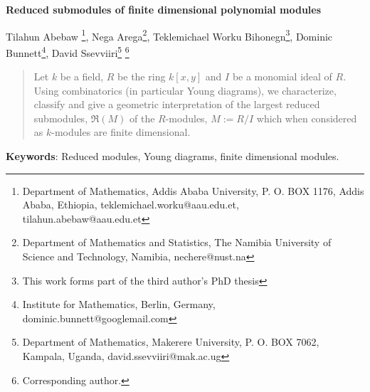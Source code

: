 \documentclass[12pt,a4paper]{article}
\begin{document}
	
	
	
	
		
		\begin{center}\Large{\bf{Reduced submodules of finite dimensional polynomial modules}}
			
		\end{center}
		\vspace*{0.3cm}
		\begin{center}
			
			
			
			
			Tilahun Abebaw \footnote{Department of Mathematics, Addis Ababa University, P. O. BOX 1176, Addis Ababa, Ethiopia, teklemichael.worku@aau.edu.et, tilahun.abebaw@aau.edu.et}, Nega Arega\footnote {Department of Mathematics and Statistics, The Namibia University of Science and Technology, Namibia,  nechere@nust.na},
			Teklemichael Worku Bihonegn\footnotemark[1] \footnote{This work forms part of the third author's PhD thesis}, Dominic Bunnett\footnote{Institute for Mathematics, Berlin, Germany, dominic.bunnett@googlemail.com},
			David Ssevviiri\footnote[5]{Department of Mathematics, Makerere University, P. O. BOX 7062, Kampala, Uganda, david.ssevviiri@mak.ac.ug} \footnote[6] {Corresponding author.}
		\end{center}
		
		\begin{abstract}
			Let $k$ be a field, $R$ be the ring $k[x, y]$ and $I$ be a monomial ideal of $R$. Using combinatorics (in particular Young diagrams), we characterize, classify and give a geometric interpretation of the largest reduced submodules, $\mathfrak{R}(M)$ of the $R$-modules, $M:=R/I$ which when considered as $k$-modules are finite dimensional.
			
		\end{abstract}
		
		{\bf Keywords}: Reduced modules, Young diagrams, finite dimensional modules.   
		
\end{document}
